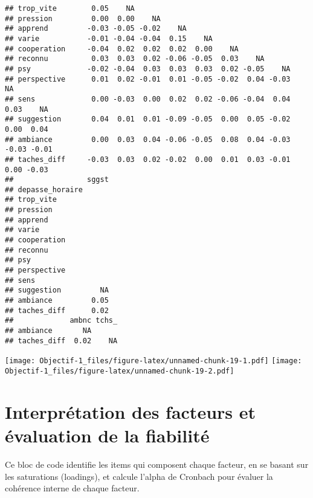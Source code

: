 \documentclass[
]{article}
\begin{document}
\begin{verbatim}
## trop_vite        0.05    NA                                                
## pression         0.00  0.00    NA                                          
## apprend         -0.03 -0.05 -0.02    NA                                    
## varie           -0.01 -0.04 -0.04  0.15    NA                              
## cooperation     -0.04  0.02  0.02  0.02  0.00    NA                        
## reconnu          0.03  0.03  0.02 -0.06 -0.05  0.03    NA                  
## psy             -0.02 -0.04  0.03  0.03  0.03  0.02 -0.05    NA            
## perspective      0.01  0.02 -0.01  0.01 -0.05 -0.02  0.04 -0.03    NA      
## sens             0.00 -0.03  0.00  0.02  0.02 -0.06 -0.04  0.04  0.03    NA
## suggestion       0.04  0.01  0.01 -0.09 -0.05  0.00  0.05 -0.02  0.00  0.04
## ambiance         0.00  0.03  0.04 -0.06 -0.05  0.08  0.04 -0.03 -0.03 -0.01
## taches_diff     -0.03  0.03  0.02 -0.02  0.00  0.01  0.03 -0.01  0.00 -0.03
##                 sggst
## depasse_horaire      
## trop_vite            
## pression             
## apprend              
## varie                
## cooperation          
## reconnu              
## psy                  
## perspective          
## sens                 
## suggestion         NA
## ambiance         0.05
## taches_diff      0.02
##             ambnc tchs_
## ambiance       NA      
## taches_diff  0.02    NA
\end{verbatim}

\texttt{[image: Objectif-1\_files/figure-latex/unnamed-chunk-19-1.pdf]}
\texttt{[image: Objectif-1\_files/figure-latex/unnamed-chunk-19-2.pdf]}

\section{Interprétation des facteurs et évaluation de la
fiabilité}\label{interpruxe9tation-des-facteurs-et-uxe9valuation-de-la-fiabilituxe9}

Ce bloc de code identifie les items qui composent chaque facteur, en se
basant sur les saturations (loadings), et calcule l'alpha de Cronbach
pour évaluer la cohérence interne de chaque facteur.
\end{document}
